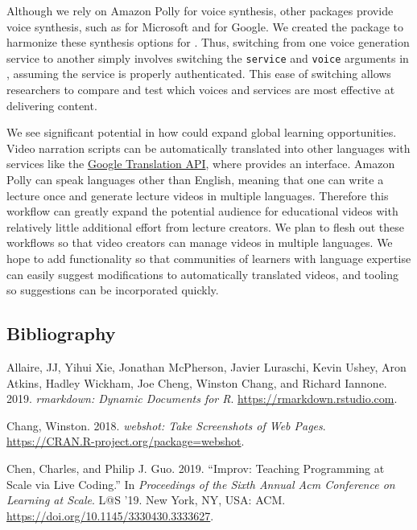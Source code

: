 Although we rely on Amazon Polly for voice synthesis, other packages
provide voice synthesis, such as  for Microsoft and
 for Google. We created the 
package to harmonize these synthesis options for . Thus,
switching from one voice generation service to another simply involves
switching the \texttt{service} and \texttt{voice} arguments in
, assuming the service is properly authenticated. This ease of
switching allows researchers to compare and test which voices and
services are most effective at delivering content.

We see significant potential in how  could expand global
learning opportunities. Video narration scripts can be automatically
translated into other languages with services like the
\href{https://cloud.google.com/translate/docs/}{Google Translation API},
where  provides an interface. Amazon Polly can
speak languages other than English, meaning that one can write a lecture
once and generate lecture videos in multiple languages. Therefore this
workflow can greatly expand the potential audience for educational
videos with relatively little additional effort from lecture creators.
We plan to flesh out these workflows so that video creators can manage
videos in multiple languages. We hope to add functionality so that
communities of learners with language expertise can easily suggest
modifications to automatically translated videos, and tooling so
suggestions can be incorporated quickly.

\hypertarget{bibliography}{%
\subsection{Bibliography}\label{bibliography}}



\hypertarget{refs}{}
\leavevmode\hypertarget{ref-rmarkdown}{}%
Allaire, JJ, Yihui Xie, Jonathan McPherson, Javier Luraschi, Kevin
Ushey, Aron Atkins, Hadley Wickham, Joe Cheng, Winston Chang, and
Richard Iannone. 2019. \emph{rmarkdown: Dynamic Documents for R}.
\url{https://rmarkdown.rstudio.com}.

\leavevmode\hypertarget{ref-webshot}{}%
Chang, Winston. 2018. \emph{webshot: Take Screenshots of Web Pages}.
\url{https://CRAN.R-project.org/package=webshot}.

\leavevmode\hypertarget{ref-ChenLAS2019}{}%
Chen, Charles, and Philip J. Guo. 2019. ``Improv: Teaching Programming
at Scale via Live Coding.'' In \emph{Proceedings of the Sixth Annual Acm
Conference on Learning at Scale}. L@S '19. New York, NY, USA: ACM.
\url{https://doi.org/10.1145/3330430.3333627}.

